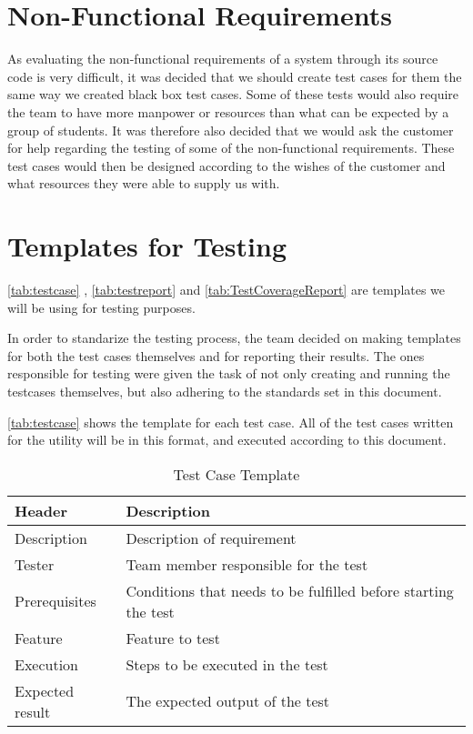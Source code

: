 \section{Non-Functional Requirements}
As evaluating the non-functional requirements of a system through its source code is very difficult, it was decided that we should create test cases for them the same way we created black box test cases. Some of these tests would also require the team to have more manpower or resources than what can be expected by a group of students. It was therefore also decided that we would ask the customer for help regarding the testing of some of the non-functional requirements. These test cases would then be designed according to the wishes of the customer and what resources they were able to supply us with.

\section{Templates for Testing}
\autoref{tab:testcase} , \autoref{tab:testreport} and \autoref{tab:TestCoverageReport} are templates we will be
using for testing purposes.

In order to standarize the testing process, the team decided on making templates for both the test cases themselves and for reporting their results. The ones responsible for testing were given the task of not only creating and running the testcases themselves, but also adhering to the standards set in this document.

\autoref{tab:testcase} shows the template for each test case. All of the test cases written for the \gls{utility} will be in this format, and executed according to this document.

\begin{table}[htb] \small \center
\caption{Test Case Template \label{tab:testcase}}
\begin{tabular}{l l}
	\toprule
	Header & Description \\
	\midrule
	Description & Description of requirement \\
	Tester & Team member responsible for the test \\
	Prerequisites & Conditions that needs to be fulfilled before starting the test \\
	Feature & Feature to test \\
	Execution & Steps to be executed in the test \\
	Expected result & The expected output of the test \\
	\bottomrule
\end{tabular}
\end{table}

